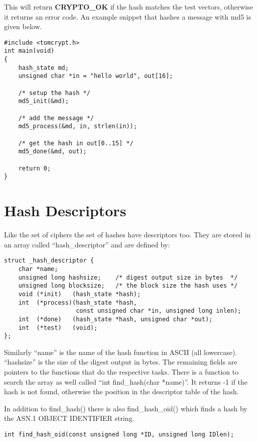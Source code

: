 \documentclass[a4paper]{book}
\begin{document}
This will return {\bf CRYPTO\_OK} if the hash matches the test vectors, otherwise it returns an error code.  An
example snippet that hashes a message with md5 is given below.
\begin{small}
\begin{verbatim}
#include <tomcrypt.h>
int main(void)
{
    hash_state md;
    unsigned char *in = "hello world", out[16];

    /* setup the hash */
    md5_init(&md);

    /* add the message */
    md5_process(&md, in, strlen(in));

    /* get the hash in out[0..15] */
    md5_done(&md, out);

    return 0;
}
\end{verbatim}
\end{small}

\section{Hash Descriptors}
Like the set of ciphers the set of hashes have descriptors too.  They are stored in an array called ``hash\_descriptor'' and
are defined by:
\begin{verbatim}
struct _hash_descriptor {
    char *name;
    unsigned long hashsize;    /* digest output size in bytes  */
    unsigned long blocksize;   /* the block size the hash uses */
    void (*init)   (hash_state *hash);
    int  (*process)(hash_state *hash, 
                    const unsigned char *in, unsigned long inlen);
    int  (*done)   (hash_state *hash, unsigned char *out);
    int  (*test)   (void);
};
\end{verbatim}

Similarly ``name'' is the name of the hash function in ASCII (all lowercase).  ``hashsize'' is the size of the digest output
in bytes.  The remaining fields are pointers to the functions that do the respective tasks.  There is a function to
search the array as well called ``int find\_hash(char *name)''.  It returns -1 if the hash is not found, otherwise the
position in the descriptor table of the hash.

In addition to find\_hash() there is also find\_hash\_oid() which finds a hash by the ASN.1 OBJECT IDENTIFIER string.
\begin{verbatim}
int find_hash_oid(const unsigned long *ID, unsigned long IDlen);
\end{verbatim}
\end{document}
